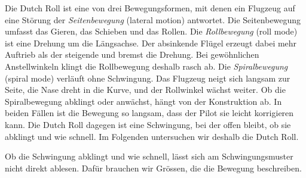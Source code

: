 Die Dutch Roll ist eine von drei Bewegungsformen, mit denen ein
Flugzeug auf eine Störung der \emph{Seitenbewegung} (lateral motion) antwortet.
Die Seitenbewegung umfasst das Gieren, das Schieben und das Rollen.
Die \emph{Rollbewegung} (roll mode) ist eine Drehung um die Längsachse.
Der absinkende Flügel erzeugt dabei mehr Auftrieb als der steigende und bremst
die Drehung.
Bei gewöhnlichen Anstellwinkeln klingt die Rollbewegung deshalb rasch ab.
Die \emph{Spiralbewegung} (spiral mode) verläuft ohne Schwingung.
Das Flugzeug neigt sich langsam zur Seite, die Nase dreht in die Kurve, und der
Rollwinkel wächst weiter.
Ob die Spiralbewegung abklingt oder anwächst, hängt von der Konstruktion ab.
In beiden Fällen ist die Bewegung so langsam, dass der Pilot sie leicht
korrigieren kann.
Die Dutch Roll dagegen ist eine Schwingung, bei der offen bleibt, ob sie
abklingt und wie schnell.
Im Folgenden untersuchen wir deshalb die Dutch Roll.

Ob die Schwingung abklingt und wie schnell, lässt sich am Schwingungsmuster
nicht direkt ablesen.
Dafür brauchen wir Grössen, die die Bewegung beschreiben.